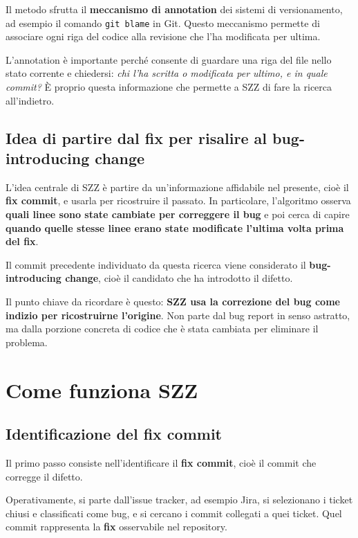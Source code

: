 Il metodo sfrutta il \textbf{meccanismo di annotation} dei sistemi di versionamento, ad esempio il comando \texttt{git blame} in Git. Questo meccanismo permette di associare ogni riga del codice alla revisione che l'ha modificata per ultima.

\begin{notaprof}
L'annotation è importante perché consente di guardare una riga del file nello stato corrente e chiedersi: \emph{chi l'ha scritta o modificata per ultimo, e in quale commit?} È proprio questa informazione che permette a SZZ di fare la ricerca all'indietro.
\end{notaprof}

\subsection{Idea di partire dal fix per risalire al bug-introducing change}

L'idea centrale di SZZ è partire da un'informazione affidabile nel presente, cioè il \textbf{fix commit}, e usarla per ricostruire il passato. In particolare, l'algoritmo osserva \textbf{quali linee sono state cambiate per correggere il bug} e poi cerca di capire \textbf{quando quelle stesse linee erano state modificate l'ultima volta prima del fix}.

Il commit precedente individuato da questa ricerca viene considerato il \textbf{bug-introducing change}, cioè il candidato che ha introdotto il difetto.

\begin{notaesame}
Il punto chiave da ricordare è questo: \textbf{SZZ usa la correzione del bug come indizio per ricostruirne l'origine}. Non parte dal bug report in senso astratto, ma dalla porzione concreta di codice che è stata cambiata per eliminare il problema.
\end{notaesame}

\section{Come funziona SZZ}

\subsection{Identificazione del fix commit}

Il primo passo consiste nell'identificare il \textbf{fix commit}, cioè il commit che corregge il difetto.

\begin{notaprof}
Operativamente, si parte dall'issue tracker, ad esempio Jira, si selezionano i ticket chiusi e classificati come bug, e si cercano i commit collegati a quei ticket. Quel commit rappresenta la \textbf{fix} osservabile nel repository.
\end{notaprof}

